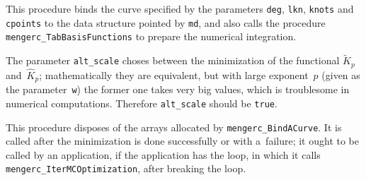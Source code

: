 This procedure binds the curve specified by the parameters \texttt{deg},
\texttt{lkn}, \texttt{knots} and \texttt{cpoints} to the data structure
pointed by \texttt{md}, and also calls the procedure
\texttt{mengerc\_TabBasisFunctions} to prepare the numerical integration.

The parameter \texttt{alt\_scale} choses between the minimization of the
functional $\tilde{K}_p$ and~$\hat{K}_p$; mathematically they are
equivalent, but with large exponent~$p$ (given as the parameter~\texttt{w})
the former one takes very big values, which is troublesome in numerical
computations. Therefore \texttt{alt\_scale} should be \texttt{true}.

\vspace{\medskipamount}
This procedure disposes of the arrays allocated by
\texttt{mengerc\_BindACurve}. It is called after the minimization is done
successfully or with a~failure; it ought to be called by an application, if
the application has the loop, in which it calls
\texttt{mengerc\_IterMCOptimization}, after breaking the loop.


\vspace{\medskipamount}

\vspace{\medskipamount}

